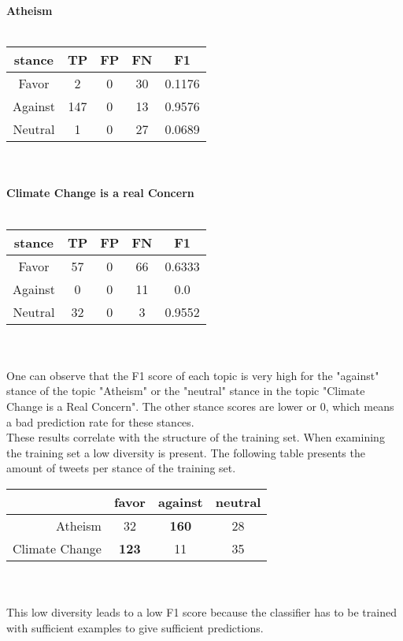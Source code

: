 \documentclass[a4paper,12pt,twoside]{article}
\begin{document}
\textbf{Atheism}\\
\\
\begin{tabular}{c|ccc|c}
stance & TP & FP & FN & F1\\ \hline
Favor & 2 & 0 & 30 & 0.1176\\
Against & 147 & 0 & 13 & 0.9576 \\
Neutral & 1 & 0 & 27 & 0.0689\\
\end{tabular}\\
\\
\textbf{Climate Change is a real Concern} \\
\\
\begin{tabular}{c|ccc|c}
stance & TP & FP & FN & F1\\ \hline
Favor & 57 & 0 & 66 & 0.6333\\
Against & 0 & 0 & 11 & 0.0\\
Neutral & 32 & 0 & 3 & 0.9552 \\
\end{tabular}\\
\\
One can observe that the F1 score of each topic is very high for the "against" stance of the topic "Atheism" or the "neutral" stance in the topic "Climate Change is a Real Concern". The other stance scores are lower or 0, which means a bad prediction rate for these stances.\\
These results correlate with the structure of the training set. When examining the training set a low diversity is present. The following table presents the amount of tweets per stance of the training set.\\

\begin{tabular}{r|ccc}
& favor & against & neutral\\ \hline
Atheism & 32 & \textbf{160} & 28 \\
Climate Change & \textbf{123} & 11 & 35 \\
\end{tabular} \\
\\
This low diversity leads to a low F1 score because the classifier has to be trained with sufficient examples to give sufficient predictions.\\
\\
\end{document}
